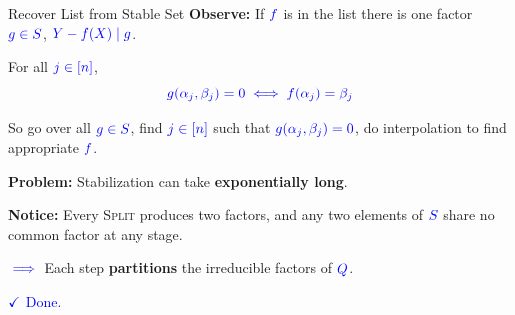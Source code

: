 \documentclass[10pt,handout]{beamer}
\begin{document}
\begin{frame}{Recover List from Stable Set}
	\textbf{Observe:} If $\textcolor{blue}{\textcolor{blue}{f}}$ is in the list there is one factor $\textcolor{blue}{\textcolor{blue}{g\in S}}$, $\textcolor{blue}{\textcolor{blue}{Y-f(X)\mid g}}$. \pause

	\begin{lemma}
		For all $\textcolor{blue}{\textcolor{blue}{j\in[n]}}$,
		$$\textcolor{blue}{\textcolor{blue}{g(\alpha_j,\beta_j)=0\iff f(\alpha_j)=\beta_j}}$$
	\end{lemma}\pause
	So go over all $\textcolor{blue}{\textcolor{blue}{g\in S}}$, find $\textcolor{blue}{\textcolor{blue}{j\in[n]}}$ such that $\textcolor{blue}{\textcolor{blue}{g(\alpha_j,\beta_j)=0}}$, do interpolation to find appropriate $\textcolor{blue}{\textcolor{blue}{f}}$.\pause

	\textbf{Problem:} Stabilization can take \textbf{exponentially long}.\pause

	\textbf{Notice:} Every \textsc{Split} produces two factors, and any two elements of $\textcolor{blue}{S}$ share no common factor at any stage.
	
	$\textcolor{blue}{\implies}$ Each step \textbf{partitions} the irreducible factors of $\textcolor{blue}{Q}$.\pause

	\vfill
	
	\hfill\textcolor{blue}{$\textcolor{blue}{\checkmark}$ Done.}
\end{frame}
\end{document}
